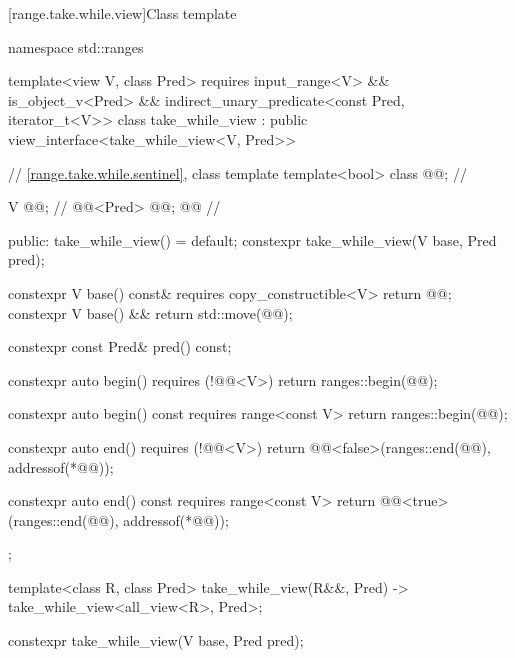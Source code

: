 [range.take.while.view]{Class template }

%
%
%
%
\begin{codeblock}
namespace std::ranges {
  template<view V, class Pred>
  requires input_range<V> && is_object_v<Pred> &&
    indirect_unary_predicate<const Pred, iterator_t<V>>
  class take_while_view : public view_interface<take_while_view<V, Pred>> {
    // \ref{range.take.while.sentinel}, class template 
    template<bool> class @@;                      // \expos

    V @@;                                            // \expos
    @@<Pred> @@; @\itcorr[-1]@                       // \expos

  public:
    take_while_view() = default;
    constexpr take_while_view(V base, Pred pred);

    constexpr V base() const& requires copy_constructible<V> { return @@; }
    constexpr V base() && { return std::move(@@); }

    constexpr const Pred& pred() const;

    constexpr auto begin() requires (!@@<V>)
    { return ranges::begin(@@); }

    constexpr auto begin() const requires range<const V>
    { return ranges::begin(@@); }

    constexpr auto end() requires (!@@<V>)
    { return @@<false>(ranges::end(@@), addressof(*@@)); }

    constexpr auto end() const requires range<const V>
    { return @@<true>(ranges::end(@@), addressof(*@@)); }
  };

  template<class R, class Pred>
    take_while_view(R&&, Pred) -> take_while_view<all_view<R>, Pred>;
}
\end{codeblock}

%
\begin{itemdecl}
constexpr take_while_view(V base, Pred pred);
\end{itemdecl}

